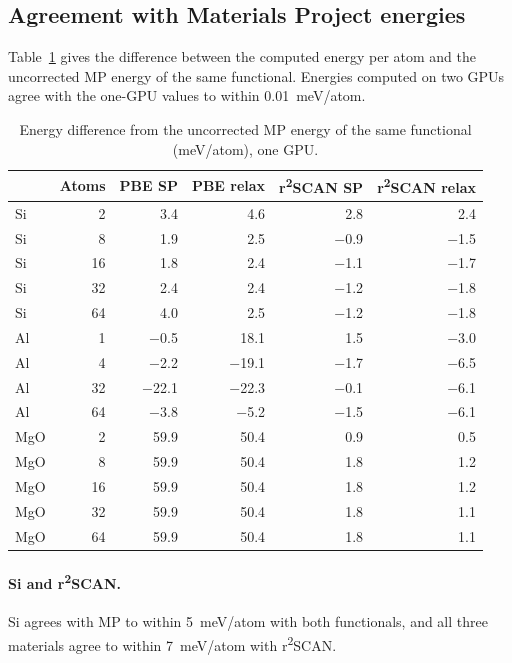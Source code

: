 \documentclass[11pt,letterpaper]{article}
\begin{document}
\subsection{Agreement with Materials Project energies}
\label{sec:res-energies}
Table~\ref{tab:dE} gives the difference between the computed energy per atom and the
uncorrected MP energy of the same functional. Energies computed on two GPUs agree with the
one-GPU values to within \SI{0.01}{meV/atom}.

\begin{table}[htbp]
\centering
\caption{Energy difference from the uncorrected MP energy of the same functional
(meV/atom), one GPU.}
\label{tab:dE}
\small
\begin{tabular}{@{}lr rrrr@{}}
\toprule
 & Atoms & PBE SP & PBE relax & r\textsuperscript{2}SCAN SP & r\textsuperscript{2}SCAN relax \\
\midrule
Si & 2 & 3.4 & 4.6 & 2.8 & 2.4 \\
Si & 8 & 1.9 & 2.5 & $-$0.9 & $-$1.5 \\
Si & 16 & 1.8 & 2.4 & $-$1.1 & $-$1.7 \\
Si & 32 & 2.4 & 2.4 & $-$1.2 & $-$1.8 \\
Si & 64 & 4.0 & 2.5 & $-$1.2 & $-$1.8 \\
\addlinespace
Al & 1 & $-$0.5 & 18.1 & 1.5 & $-$3.0 \\
Al & 4 & $-$2.2 & $-$19.1 & $-$1.7 & $-$6.5 \\
Al & 32 & $-$22.1 & $-$22.3 & $-$0.1 & $-$6.1 \\
Al & 64 & $-$3.8 & $-$5.2 & $-$1.5 & $-$6.1 \\
\addlinespace
MgO & 2 & 59.9 & 50.4 & 0.9 & 0.5 \\
MgO & 8 & 59.9 & 50.4 & 1.8 & 1.2 \\
MgO & 16 & 59.9 & 50.4 & 1.8 & 1.2 \\
MgO & 32 & 59.9 & 50.4 & 1.8 & 1.1 \\
MgO & 64 & 59.9 & 50.4 & 1.8 & 1.1 \\
\bottomrule
\end{tabular}
\end{table}

\paragraph{Si and r\textsuperscript{2}SCAN.} Si agrees with MP to within \SI{5}{meV/atom} with
both functionals, and all three materials agree to within \SI{7}{meV/atom} with
r\textsuperscript{2}SCAN.
\end{document}
